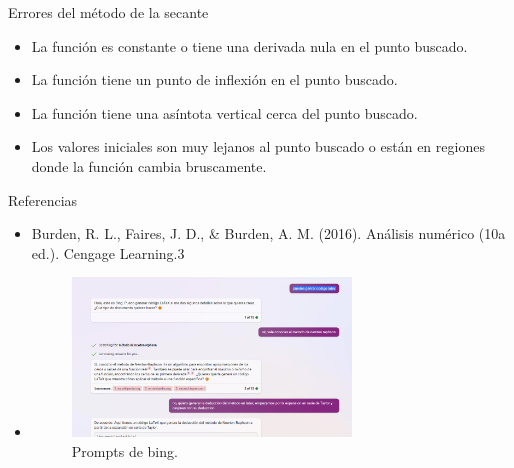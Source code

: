 \documentclass{beamer}
\begin{document}
\begin{frame}{Errores del método de la secante}
\begin{itemize}
\item La función es constante o tiene una derivada nula en el punto buscado.
\item La función tiene un punto de inflexión en el punto buscado.
\item La función tiene una asíntota vertical cerca del punto buscado.

\item Los valores iniciales son muy lejanos al punto buscado o están en regiones donde la función cambia bruscamente.

\end{itemize}
\end{frame}




\begin{frame}{Referencias}
\begin{itemize}
 \item Burden, R. L., Faires, J. D., & Burden, A. M. (2016). Análisis numérico (10a ed.). Cengage Learning.3

\item 

\begin{figure} \includegraphics[width=0.7\textwidth]{prompts-de-beam.png} \caption{Prompts de bing.} \end{figure} 

\end{itemize}
\end{frame}

 
\end{document}
